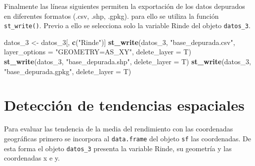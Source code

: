 \documentclass[11pt,b5paper,]{krantz}
\newenvironment{Shaded}{}{}
\newcommand{\DataTypeTok}[1]{\textcolor[rgb]{0.56,0.13,0.00}{#1}}
\newcommand{\DecValTok}[1]{\textcolor[rgb]{0.25,0.63,0.44}{#1}}
\newcommand{\KeywordTok}[1]{\textcolor[rgb]{0.00,0.44,0.13}{\textbf{#1}}}
\newcommand{\NormalTok}[1]{#1}
\newcommand{\StringTok}[1]{\textcolor[rgb]{0.25,0.44,0.63}{#1}}
\begin{document}
Finalmente las líneas siguientes permiten la exportación de los datos depurados en diferentes formatos (.csv, .shp, .gpkg). para ello se utiliza la función \texttt{st\_write()}. Previo a ello se selecciona solo la variable Rinde del objeto \texttt{datos\_3}.

\begin{Shaded}
\begin{Highlighting}[]
\NormalTok{datos_}\DecValTok{3}\NormalTok{ <-}\StringTok{ }\NormalTok{datos_}\DecValTok{3}\NormalTok{[, }\KeywordTok{c}\NormalTok{(}\StringTok{"Rinde"}\NormalTok{)]}
\KeywordTok{st_write}\NormalTok{(datos_}\DecValTok{3}\NormalTok{,}
         \StringTok{"base_depurada.csv"}\NormalTok{,}
         \DataTypeTok{layer_options =} \StringTok{"GEOMETRY=AS_XY"}\NormalTok{,}
         \DataTypeTok{delete_layer =}\NormalTok{ T)}
\KeywordTok{st_write}\NormalTok{(datos_}\DecValTok{3}\NormalTok{, }
         \StringTok{"base_depurada.shp"}\NormalTok{, }
         \DataTypeTok{delete_layer =}\NormalTok{ T)}
\KeywordTok{st_write}\NormalTok{(datos_}\DecValTok{3}\NormalTok{, }
         \StringTok{"base_depurada.gpkg"}\NormalTok{, }
         \DataTypeTok{delete_layer =}\NormalTok{ T)}
\end{Highlighting}
\end{Shaded}

\hypertarget{detecciuxf3n-de-tendencias-espaciales}{%
\section{Detección de tendencias espaciales}\label{detecciuxf3n-de-tendencias-espaciales}}

Para evaluar las tendencia de la media del rendimiento con las coordenadas geográficas primero se incorpora al \texttt{data.frame} del objeto \texttt{sf} las coordenadas. De esta forma el objeto \texttt{datos\_3} presenta la variable Rinde, su geometría y las coordenadas x e y.
\end{document}
